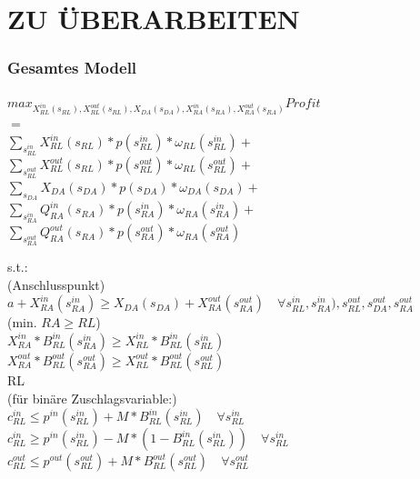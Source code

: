 
\chapter{ZU ÜBERARBEITEN}


\subsection{Gesamtes Modell}
\begin{center}
$max_{X^{in}_{RL}(s_{RL}), X^{out}_{RL}(s_{RL}), X_{DA}(s_{DA}), X^{in}_{RA}(s_{RA}), X^{out}_{RA}(s_{RA})} Profit $\\
$=$\\
        $\sum_{s^{in}_{RL}} X^{in}_{RL}(s_{RL}) * p(s^{in}_{RL}) * \omega_{RL}(s^{in}_{RL}) +$\\
        $\sum_{s^{out}_{RL}} X^{out}_{RL}(s_{RL}) * p(s^{out}_{RL}) * \omega_{RL}(s^{out}_{RL}) +$\\
        $\sum_{s_{DA}} X_{DA}(s_{DA}) * p(s_{DA}) * \omega_{DA}(s_{DA}) +$\\
	$\sum_{s^{in}_{RA}} Q^{in}_{RA}(s_{RA}) * p(s^{in}_{RA}) * \omega_{RA}(s^{in}_{RA}) +$\\
	$\sum_{s^{out}_{RA}} Q^{out}_{RA}(s_{RA}) * p(s^{out}_{RA}) * \omega_{RA}(s^{out}_{RA})$\\
\end{center}
s.t.:\\
(Anschlusspunkt)\\
        $a + X^{in}_{RA}(s^{in}_{RA}) \geq X_{DA}(s_{DA}) + X^{out}_{RA}(s^{out}_{RA}) \quad\forall s^{in}_{RL},s^{in}_{RA}),s^{out}_{RL},s^{out}_{DA},s^{out}_{RA} $\\
(min. $RA \geq RL$)\\
        $ X^{in}_{RA} * B^{in}_{RL}(s^{in}_{RA}) \geq X^{in}_{RL} * B^{in}_{RL}(s^{in}_{RL})$\\
        $ X^{out}_{RA} * B^{out}_{RL}(s^{out}_{RA}) \geq X^{out}_{RL} * B^{out}_{RL}(s^{out}_{RL})$\\
RL\\
        (für binäre Zuschlagsvariable:)\\
        $c^{in}_{RL} \leq p^{in}(s^{in}_{RL}) + M * B^{in}_{RL}(s^{in}_{RL})\quad\forall s^{in}_{RL} $ \\
        $c^{in}_{RL} \geq p^{in}(s^{in}_{RL}) - M * (1 - B^{in}_{RL}(s^{in}_{RL}))\quad\forall s^{in}_{RL} $ \\
        $c^{out}_{RL} \leq p^{out}(s^{out}_{RL}) + M * B^{out}_{RL}(s^{out}_{RL})\quad\forall s^{out}_{RL} $ \\
